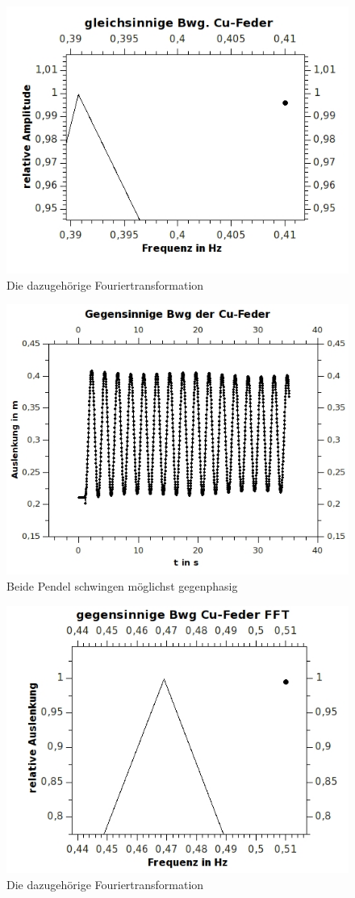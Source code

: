 \begin{figure}[h!]
\centering
\includegraphics[width=0.55\linewidth]{../Messungen/graphen/gleich-Bwg-Cu-FFT}
\caption{Die dazugehörige Fouriertransformation}
\label{fig:gleich-Bwg-Cu-FFT}
\end{figure}

\clearpage

\begin{figure}[h!]
\centering
\includegraphics[width=0.55\linewidth]{../Messungen/graphen/gg-Bwg-Cu}
\caption{Beide Pendel schwingen möglichst gegenphasig}
\label{fig:gg-Bwg-Cu}
\end{figure}

\begin{figure}[h!]
\centering
\includegraphics[width=0.7\linewidth]{../Messungen/graphen/gg-Bwg-Cu-FFT}
\caption{Die dazugehörige Fouriertransformation}
\label{fig:gg-Bwg-Cu-FFT}
\end{figure}


